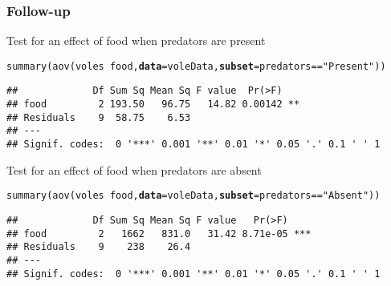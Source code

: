\documentclass[color=usenames,dvipsnames]{beamer}\usepackage[]{graphicx}\usepackage[]{color}
\makeatletter
\newcommand{\hlstr}[1]{\textcolor[rgb]{0.749,0.012,0.012}{#1}}%
\newcommand{\hlopt}[1]{\textcolor[rgb]{0,0,0}{#1}}%
\newcommand{\hlstd}[1]{\textcolor[rgb]{0,0,0}{#1}}%
\newcommand{\hlkwc}[1]{\textcolor[rgb]{0,0,0}{\textbf{#1}}}%
\newcommand{\hlkwd}[1]{\textcolor[rgb]{0.004,0.004,0.506}{#1}}%
\newenvironment{kframe}{%
 \def\at@end@of@kframe{}%
 \ifinner\ifhmode%
  \def\at@end@of@kframe{\end{minipage}}%
  \begin{minipage}{\columnwidth}%
 \fi\fi%
 \def\FrameCommand##1{\hskip\@totalleftmargin \hskip-\fboxsep
 \colorbox{shadecolor}{##1}\hskip-\fboxsep
     \hskip-\linewidth \hskip-\@totalleftmargin \hskip\columnwidth}%
 \MakeFramed {\advance\hsize-\width
   \@totalleftmargin\z@ \linewidth\hsize
   \@setminipage}}%
 {\par\unskip\endMakeFramed%
 \at@end@of@kframe}
\newenvironment{knitrout}{}{} %
\makeatother
\begin{document}
\begin{frame}[fragile]
  \frametitle{Follow-up}
  \footnotesize
  Test for an effect of food when predators are present
\begin{knitrout}\scriptsize
{}\color{fgcolor}\begin{kframe}
\begin{alltt}
\hlkwd{summary}\hlstd{(}\hlkwd{aov}\hlstd{(voles} \hlopt{~} \hlstd{food,} \hlkwc{data}\hlstd{=voleData,} \hlkwc{subset}\hlstd{=predators}\hlopt{==}\hlstr{"Present"}\hlstd{))}
\end{alltt}
\begin{verbatim}
##             Df Sum Sq Mean Sq F value  Pr(>F)   
## food         2 193.50   96.75   14.82 0.00142 **
## Residuals    9  58.75    6.53                   
## ---
## Signif. codes:  0 '***' 0.001 '**' 0.01 '*' 0.05 '.' 0.1 ' ' 1
\end{verbatim}
\end{kframe}
\end{knitrout}
\pause
\vfill
  Test for an effect of food when predators are absent
\begin{knitrout}\scriptsize
{}\color{fgcolor}\begin{kframe}
\begin{alltt}
\hlkwd{summary}\hlstd{(}\hlkwd{aov}\hlstd{(voles} \hlopt{~} \hlstd{food,} \hlkwc{data}\hlstd{=voleData,} \hlkwc{subset}\hlstd{=predators}\hlopt{==}\hlstr{"Absent"}\hlstd{))}
\end{alltt}
\begin{verbatim}
##             Df Sum Sq Mean Sq F value   Pr(>F)    
## food         2   1662   831.0   31.42 8.71e-05 ***
## Residuals    9    238    26.4                     
## ---
## Signif. codes:  0 '***' 0.001 '**' 0.01 '*' 0.05 '.' 0.1 ' ' 1
\end{verbatim}
\end{kframe}
\end{knitrout}
\end{frame}
\end{document}
